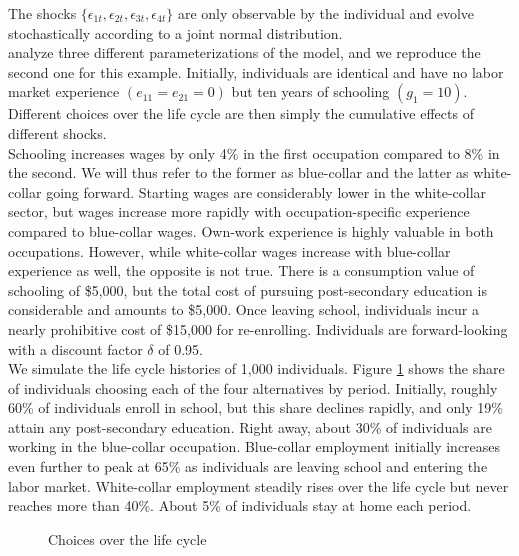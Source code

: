 \noindent The shocks $\{\epsilon_{1t},\epsilon_{2t},\epsilon_{3t},\epsilon_{4t}\}$ are only observable by the individual and evolve stochastically according to a joint normal distribution.\\

\noindent \citet{Keane.1994} analyze three different parameterizations of the model, and we reproduce the second one for this example. Initially, individuals are identical and have no labor market experience $(e_{11} = e_{21} = 0)$ but ten years of schooling $(g_1 = 10)$. Different choices over the life cycle are then simply the cumulative effects of different shocks.\\

\noindent Schooling increases wages by only 4\% in the first occupation compared to 8\% in the second. We will thus refer to the former as blue-collar and the latter as white-collar going forward. Starting wages are considerably lower in the white-collar sector, but wages increase more rapidly with occupation-specific experience compared to blue-collar wages. Own-work experience is highly valuable in both occupations. However, while white-collar wages increase with blue-collar experience as well, the opposite is not true. There is a consumption value of schooling of \$5,000, but the total cost of pursuing post-secondary education is considerable and amounts to \$5,000. Once leaving school, individuals incur a nearly prohibitive cost of \$15,000 for re-enrolling. Individuals are forward-looking with a discount factor $\delta$ of 0.95.\\

\noindent We simulate the life cycle histories of 1,000 individuals. Figure \ref{Choices over the life cycle} shows the share of individuals choosing each of the four alternatives by period. Initially, roughly 60\% of individuals enroll in school, but this share declines rapidly, and only 19\% attain any post-secondary education. Right away, about 30\% of individuals are working in the blue-collar occupation.  Blue-collar employment initially increases even further to peak at 65\% as individuals are leaving school and entering the labor market. White-collar employment steadily rises over the life cycle but never reaches more than 40\%. About 5\% of individuals stay at home each period.

\begin{figure}[ht!]\centering
\caption{Choices over the life cycle}\label{Choices over the life cycle}
\end{figure}\FloatBarrier

